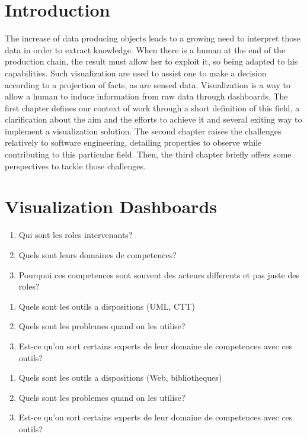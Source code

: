 \documentclass{acm_proc_article-sp}
\begin{document}
\section{Introduction}
The increase of data producing objects leads to a growing need to
interpret those data in order to extract knowledge. When there is a
human at the end of the production chain, the result must allow her to
exploit it, so being adapted to his capabilities. Such visualization
are used to assist one to make a decision according to a projection of
facts, as are sensed data. Visualization is a way to allow a human to
induce information from raw data through dashboards. The first chapter
defines our context of work through a short definition of this field,
a clarification about the aim and the efforts to achieve it and
several exiting way to implement a visualization solution. The second
chapter raises the challenges relatively to software engineering,
detailing properties to observe while contributing to this particular
field. Then, the third chapter briefly offers some perspectives to
tackle those challenges.

\section{Visualization Dashboards}
\begin{enumerate}
\item Qui sont les roles intervenants?
\item Quels sont leurs domaines de competences?
\item Pourquoi ces competences sont souvent des acteurs differents et pas juste des roles?
\end{enumerate}

\begin{enumerate}
\item Quels sont les outils a dispositions (UML, CTT)
\item Quels sont les problemes quand on les utilise?
\item Est-ce qu'on sort certains experts de leur domaine de competences avec ces outils?
\end{enumerate}

\begin{enumerate}
\item Quels sont les outils a dispositions (Web, bibliotheques)
\item Quels sont les problemes quand on les utilise?
\item Est-ce qu'on sort certains experts de leur domaine de competences avec ces outils?
\end{enumerate}
\end{document}
